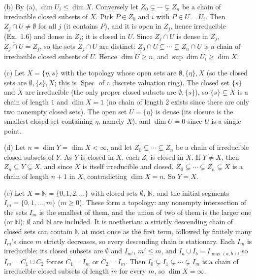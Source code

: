 \documentclass[11pt]{article}
\begin{document}
(b) By (a), $\dim U_i\le\dim X$. Conversely let $Z_0\subsetneq\cdots\subsetneq Z_n$ be a chain of irreducible closed subsets of $X$. Pick $P\in Z_0$ and $i$ with $P\in U=U_i$. Then $Z_j\cap U\ne\emptyset$ for all $j$ (it contains $P$), and it is open in $Z_j$, hence irreducible (Ex.~1.6) and dense in $Z_j$; it is closed in $U$. Since $Z_j\cap U$ is dense in $Z_j$, $\overline{Z_j\cap U}=Z_j$, so the sets $Z_j\cap U$ are distinct: $Z_0\cap U\subsetneq\cdots\subsetneq Z_n\cap U$ is a chain of irreducible closed subsets of $U$. Hence $\dim U\ge n$, and $\sup\dim U_i\ge\dim X$.

(c) Let $X=\{\eta,s\}$ with the topology whose open sets are $\emptyset,\{\eta\},X$ (so the closed sets are $\emptyset,\{s\},X$; this is $\operatorname{Spec}$ of a discrete valuation ring). The closed set $\{s\}$ and $X$ are irreducible (the only proper closed subsets are $\emptyset,\{s\}$), so $\{s\}\subsetneq X$ is a chain of length $1$ and $\dim X=1$ (no chain of length $2$ exists since there are only two nonempty closed sets). The open set $U=\{\eta\}$ is dense (its closure is the smallest closed set containing $\eta$, namely $X$), and $\dim U=0$ since $U$ is a single point.

(d) Let $n=\dim Y=\dim X<\infty$, and let $Z_0\subsetneq\cdots\subsetneq Z_n$ be a chain of irreducible closed subsets of $Y$. As $Y$ is closed in $X$, each $Z_i$ is closed in $X$. If $Y\ne X$, then $Z_n\subseteq Y\subsetneq X$, and since $X$ is itself irreducible and closed, $Z_0\subsetneq\cdots\subsetneq Z_n\subsetneq X$ is a chain of length $n+1$ in $X$, contradicting $\dim X=n$. So $Y=X$.

(e) Let $X=\mathbb N=\{0,1,2,\dots\}$ with closed sets $\emptyset$, $\mathbb N$, and the initial segments $I_m=\{0,1,\dots,m\}$ ($m\ge0$). These form a topology: any nonempty intersection of the sets $I_m$ is the smallest of them, and the union of two of them is the larger one (or $\mathbb N$); $\emptyset$ and $\mathbb N$ are included. It is noetherian: a strictly descending chain of closed sets can contain $\mathbb N$ at most once as the first term, followed by finitely many $I_m$'s since $m$ strictly decreases, so every descending chain is stationary. Each $I_m$ is irreducible: its closed subsets are $\emptyset$ and $I_{m'}$, $m'\le m$, and $I_a\cup I_b=I_{\max(a,b)}$, so $I_m=C_1\cup C_2$ forces $C_1=I_m$ or $C_2=I_m$. Then $I_0\subsetneq I_1\subsetneq\cdots\subsetneq I_m$ is a chain of irreducible closed subsets of length $m$ for every $m$, so $\dim X=\infty$.
\end{document}

